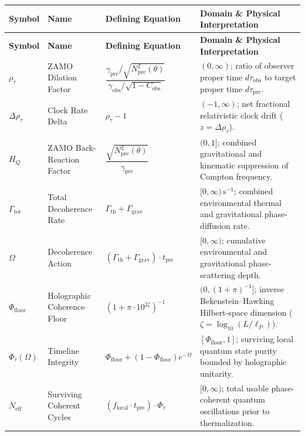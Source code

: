 \documentclass[11pt,a4paper]{article}
\begin{document}
\small
\begin{longtable}{>{\raggedright\arraybackslash}p{2.2cm} >{\raggedright\arraybackslash}p{3.4cm} >{\raggedright\arraybackslash}p{4.6cm} >{\raggedright\arraybackslash}p{5.2cm}}
\toprule
\textbf{Symbol} & \textbf{Name} & \textbf{Defining Equation} & \textbf{Domain \& Physical Interpretation} \\
\midrule
\endfirsthead
\toprule
\textbf{Symbol} & \textbf{Name} & \textbf{Defining Equation} & \textbf{Domain \& Physical Interpretation} \\
\midrule
\endhead
\bottomrule
\endfoot
$\rho_\tau$ & ZAMO Dilation Factor & $\dfrac{\gamma_{\mathrm{pre}} / \sqrt{N_{\mathrm{pre}}^2(\theta)}}{\gamma_{\mathrm{obs}} / \sqrt{1 - C_{\mathrm{obs}}}}$ & $(0, \infty)$; ratio of observer proper time $d\tau_{\mathrm{obs}}$ to target proper time $d\tau_{\mathrm{pre}}$. \\[1.4ex]
$\Delta\rho_\tau$ & Clock Rate Delta & $\rho_\tau - 1$ & $(-1, \infty)$; net fractional relativistic clock drift ($z = \Delta\rho_\tau$). \\[1.2ex]
$H_Q$ & ZAMO Back-Reaction Factor & $\dfrac{\sqrt{N_{\mathrm{pre}}^2(\theta)}}{\gamma_{\mathrm{pre}}}$ & $(0, 1]$; combined gravitational and kinematic suppression of Compton frequency. \\[1.4ex]
$\Gamma_{\mathrm{tot}}$ & Total Decoherence Rate & $\Gamma_{\mathrm{th}} + \Gamma_{\mathrm{grav}}$ & $[0, \infty)\,\mathrm{s}^{-1}$; combined environmental thermal and gravitational phase-diffusion rate. \\[1.2ex]
$\Omega$ & Decoherence Action & $(\Gamma_{\mathrm{th}} + \Gamma_{\mathrm{grav}}) \cdot t_{\mathrm{pre}}$ & $[0, \infty)$; cumulative environmental and gravitational phase-scattering depth. \\[1.2ex]
$\Phi_{\mathrm{floor}}$ & Holographic Coherence Floor & $(1 + \pi \cdot 10^{2\zeta})^{-1}$ & $(0, (1+\pi)^{-1}]$; inverse Bekenstein--Hawking Hilbert-space dimension ($\zeta = \log_{10}(L/\ell_P)$). \\[1.2ex]
$\Phi_\tau(\Omega)$ & Timeline Integrity & $\Phi_{\mathrm{floor}} + (1 - \Phi_{\mathrm{floor}})e^{-\Omega}$ & $[\Phi_{\mathrm{floor}}, 1]$; surviving local quantum state purity bounded by holographic unitarity. \\[1.2ex]
$N_{\mathrm{eff}}$ & Surviving Coherent Cycles & $(f_{\mathrm{local}} \cdot t_{\mathrm{pre}}) \cdot \Phi_\tau$ & $[0, \infty)$; total usable phase-coherent quantum oscillations prior to thermalization. \\[1.2ex]

\end{longtable}
\end{document}
